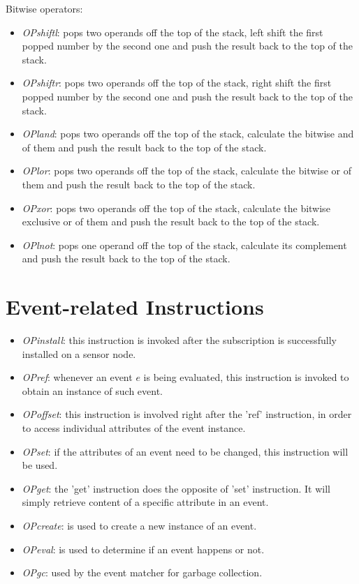 Bitwise operators:
\begin{itemize}
\item \emph{OPshiftl}: pops two operands off the top of the stack, left shift the first popped number by the second one and push the result back to the top of the stack.
\item \emph{OPshiftr}: pops two operands off the top of the stack, right shift the first popped number by the second one and push the result back to the top of the stack.
\item \emph{OPland}: pops two operands off the top of the stack, calculate the bitwise and of them and push the result back to the top of the stack.
\item \emph{OPlor}: pops two operands off the top of the stack, calculate the bitwise or of them and push the result back to the top of the stack.
\item \emph{OPxor}: pops two operands off the top of the stack, calculate the bitwise exclusive or of them and push the result back to the top of the stack.
\item \emph{OPlnot}: pops one operand off the top of the stack, calculate its complement and push the result back to the top of the stack.
\end{itemize}

\section{Event-related Instructions}
\begin{itemize}
\item \emph{OPinstall}: this instruction is invoked after the subscription is successfully installed on a sensor node.
\item \emph{OPref}: whenever an event \(e\) is being evaluated, this instruction is invoked to obtain an instance of such event.
\item \emph{OPoffset}: this instruction is involved right after the 'ref' instruction, in order to access individual attributes of the event instance.
\item \emph{OPset}: if the attributes of an event need to be changed, this instruction will be used.
\item \emph{OPget}: the 'get' instruction does the opposite of 'set' instruction. It will simply retrieve content of a specific attribute in an event.
\item \emph{OPcreate}: is used to create a new instance of an event.
\item \emph{OPeval}: is used to determine if an event happens or not.
\item \emph{OPgc}: used by the event matcher for garbage collection.
\end{itemize}